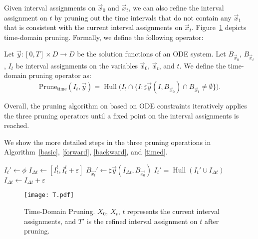 \documentclass[11pt]{article}
\newcommand{\prunetime}{\mathrm{Prune}_{\mathrm{time}}}
\newcommand{\BXt}{\ensuremath{B_{\vec{x_t}}}}
\newcommand{\BXz}{\ensuremath{B_{\vec{x_0}}}}
\DeclareMathOperator{\Hull}{Hull}
\begin{document}
 Given interval assignments on $\vec x_0$ and $\vec x_t$, we can also refine the interval assignment on $t$ by pruning out the time intervals that do not contain any $\vec x_t$ that is consistent with the current interval assignments on $\vec x_t$. Figure~\ref{tp} depicts time-domain pruning. Formally, we define the following operator:
\begin{definition}
Let $\vec y:[0,T]\times D\rightarrow D$ be the solution functions of an ODE system. Let $B_{\vec x_0}$, $B_{\vec x_t}$, $I_{t}$ be interval assignments on the variables $\vec x_0$, $\vec x_t$, and $t$. We define the time-domain pruning operator as:
$$\mathrm{Prune}_{\mathrm{time}}(I_{t}, \vec y) =\Hull\Big(I_{t}\cap \{I : \sharp \vec y(I, B_{\vec x_0})\cap  B_{\vec x_t} \not= \emptyset\}\Big).$$

\end{definition}


Overall, the pruning algorithm on based on ODE constraints iteratively applies the three pruning operators until a fixed point on the interval assignments is reached.

We show the more detailed steps in the three pruning operations in Algorithm~\ref{basic}, \ref{forward}, \ref{backward}, and \ref{timed}.

\begin{algorithm}\label{alg:I_timeP}
\caption{$\prunetime(\sharp{\vec{y}}, \BXz, \BXt, I_t)$}\label{timed}
\begin{algorithmic}[1]
  \State $I_t' \gets \phi$
  \State $I_{{\Delta}t} \gets [I_t^l, I_t^l + {\varepsilon}]$
      \State $\BXt' \gets \sharp{\vec{y}}({{I_{{\Delta}t}}}, \BXz)$
      \If{$\BXt' \cap \BXt \not = \phi$}
          \State $I_t' = \Hull(I_t' \cup {{I_{{\Delta}t}}})$
      \Else
          \State $I_{{\Delta}t} \gets I_{{\Delta}t} + {\varepsilon}$
      \EndIf
  \EndWhile
  \State {}
\end{algorithmic}
\end{algorithm}

\begin{figure}
\begin{center}
\texttt{[image: T.pdf]}
\end{center}
\caption{Time-Domain Pruning.
 $X_0$, $X_t$, $t$ represents the current interval assignments, and $T'$ is the refined interval assignment on $t$ after pruning.
}\label{tp}
\end{figure}
\end{document}
